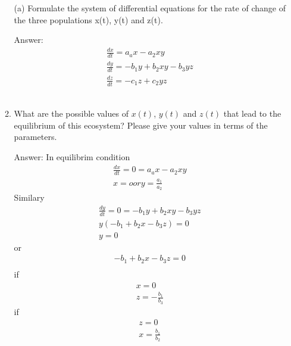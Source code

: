 \documentclass[12pt]{article}
\begin{document}
\begin{enumerate}[{\bf I.}]
\begin{enumerate}
   (a) Formulate the system of differential equations for the rate of change of the three populations x(t), y(t) and z(t).
   
   Answer:
   \begin{align}
   \frac{dx}{dt} = a_ax - a_2xy \\
   \frac{dy}{dt} = -b_1y + b_2xy -b_3yz \\
   \frac{dz}{dt} = -c_1z + c_2 yz
   \end{align}\
  
  
  
  \item What are the possible values of $x(t)$, $y(t)$ and $z(t)$ that lead to the equilibrium of this ecosystem? Please give your values in terms of the parameters.
  
   Answer: In equilibrim condition
   \begin{align}
   \nonumber
   \frac{dx}{dt} = 0 = a_ax - a_2xy\\
   \nonumber
   x = o or y = \frac{a_1}{a_2}
   \end{align}
   Similary
   \begin{align}
   \nonumber
   \frac{dy}{dt} = 0 = -b_1y + b_2xy -b_3yz \\
   \nonumber
   y(-b_1 + b_2x - b_3z) = 0\\
   \nonumber
   y = 0 
   \end{align}
   or
   \begin{align}
   \nonumber
   -b_1 +b_2x -b_3z =0\\
   \end{align}
   if 
   \begin{align}
   \nonumber
   x = 0\\
   \nonumber
   z = -\frac{b_1}{b_3}
   \end{align}
   if 
   \begin{align}
   \nonumber
   z = 0\\
   \nonumber
   x = \frac{b_1}{b_2}
   \end{align}
  

\end{enumerate}
\end{enumerate}
\end{document}
